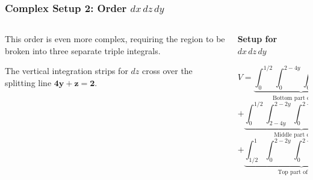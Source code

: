 \documentclass[aspectratio=169, UTF8]{beamer}
\begin{document}
\begin{frame}
\frametitle{Complex Setup 2: Order $dx\,dz\,dy$}

\begin{columns}[T]
    \begin{column}{0.5\textwidth}
        This order is even more complex, requiring the region to be broken into three separate triple integrals.
        \vspace{1em}
        
        The vertical integration strips for $dz$ cross over the splitting line $\mathbf{4y+z=2}$.
        
        \begin{center}
        \end{center}
        
    \end{column}
    
    \begin{column}{0.5\textwidth}
        \textbf{Setup for $dx\,dz\,dy$}
        \vspace{1em}
        
        {\small
        $$ V = \underbrace{\int_0^{1/2} \int_0^{2-4y} \int_0^{2y} dx\,dz\,dy}_{\text{Bottom part of region}} $$
        $$ + \underbrace{\int_0^{1/2} \int_{2-4y}^{2-2y} \int_0^{2-2y-z} dx\,dz\,dy}_{\text{Middle part of region}} $$
        $$ + \underbrace{\int_{1/2}^1 \int_0^{2-2y} \int_0^{2-2y-z} dx\,dz\,dy}_{\text{Top part of region}} $$
        }
        
        
    \end{column}

\end{columns}
\end{frame}
\end{document}
